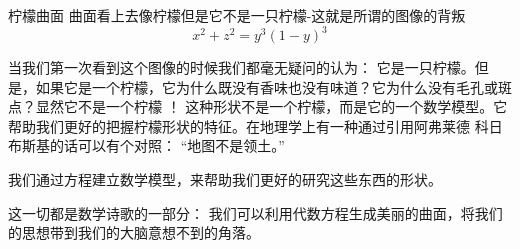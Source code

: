 ﻿\begin{surferPage}{柠檬曲面}
曲面看上去像柠檬但是它不是一只柠檬-这就是所谓的图像的背叛\\
\smallskip
\[x^2 + z^2 = y^3 (1 - y)^3\] 

\singlespacing
当我们第一次看到这个图像的时候我们都毫无疑问的认为： 它是一只柠檬。但是，如果它是一个柠檬，它为什么既没有香味也没有味道？它为什么没有毛孔或斑点？显然它不是一个柠檬 ！
\singlespacing
这种形状不是一个柠檬，而是它的一个数学模型。它帮助我们更好的把握柠檬形状的特征。在地理学上有一种通过引用阿弗莱德 科日布斯基的话可以有个对照： “地图不是领土。”\\

\singlespacing

我们通过方程建立数学模型，来帮助我们更好的研究这些东西的形状。

\singlespacing

这一切都是数学诗歌的一部分： 我们可以利用代数方程生成美丽的曲面，将我们的思想带到我们的大脑意想不到的角落。
\end{surferPage}
